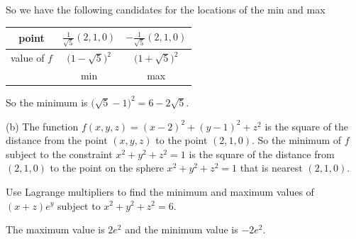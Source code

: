 \begin{solution}
\begin{itemize}
\end{itemize}
So we have the following candidates for the locations of the min and max
\begin{center}
\renewcommand{\arraystretch}{1.3}
     \begin{tabular}{|c|c|c|}
     \hline
       point
       &$\frac{1}{\sqrt{5}}(2,1,0)$
       &$-\frac{1}{\sqrt{5}}(2,1,0)$ \\ \hline
       value of $f$
       &$\big(1-\sqrt{5}\big)^2$
       &$\big(1+\sqrt{5}\big)^2$ \\ \hline
       &min 
       &max \\ \hline
     \end{tabular}
\renewcommand{\arraystretch}{1.0}
\end{center}
So the minimum is $\big(\sqrt{5}-1\big)^2=6-2\sqrt{5}$.

(b)
The function $f(x,y,z) = (x-2)^2 + (y-1)^2 + z^2$
is the square of the distance from the point $(x,y,z)$ to the
point $(2,1,0)$. So the minimum of $f$ subject to the constraint
$x^2+y^2+z^2=1$ is the square of the distance from $(2,1,0)$ to 
the point on the sphere $x^2+y^2+z^2=1$ that is nearest $(2,1,0)$.
\end{solution}

\begin{question}[M200 2015D] %
Use Lagrange multipliers to find the minimum and maximum values of 
$(x + z)e^y$ subject to $x^2 + y^2 + z^2 = 6$.
\end{question}

%

\begin{answer}
The maximum value is $2e^2$ and the minimum value is $-2 e^2$.
\end{answer}

